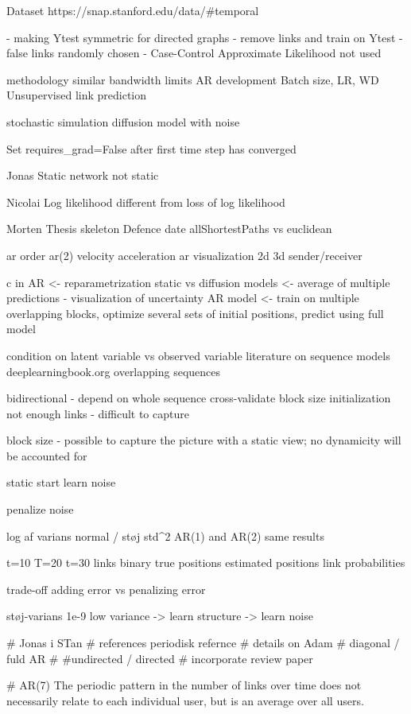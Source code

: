 Dataset https://snap.stanford.edu/data/#temporal

- making Ytest symmetric for directed graphs
- remove links and train on Ytest
- false links randomly chosen
- Case-Control Approximate Likelihood not used

methodology similar
bandwidth limits
AR development
Batch size, LR, WD
Unsupervised link prediction

stochastic simulation
diffusion model with noise

Set requires_grad=False after first time step has converged

Jonas
    Static network not static
    
Nicolai
    Log likelihood different from loss of log likelihood
    
Morten
    Thesis skeleton
    Defence date
    allShortestPaths vs euclidean


ar order
ar(2) velocity acceleration
ar visualization 2d 3d sender/receiver

c in AR <- reparametrization
static vs diffusion models <- average of multiple predictions - visualization of uncertainty
AR model <- train on multiple overlapping blocks, optimize several sets of initial positions, predict using full model

condition on latent variable vs observed variable
literature on sequence models deeplearningbook.org
overlapping sequences


bidirectional - depend on whole sequence
cross-validate block size
initialization
not enough links - difficult to capture 

block size - possible to capture the picture with a static view; no dynamicity will be accounted for


static start 
learn noise


penalize noise

log af varians normal / støj std^2
AR(1) and AR(2) same results

t=10 T=20 t=30
links binary
true positions
estimated positions
link probabilities

trade-off
adding error vs penalizing error

støj-varians 1e-9
low variance -> learn structure -> learn noise


        
        # Jonas i STan
        # references periodisk refernce
        # details on Adam
        # diagonal / fuld AR
        # #undirected / directed 
        # incorporate review paper

# AR(7) The periodic pattern in the number of links over time does not necessarily relate to each individual user, but is an average over all users.